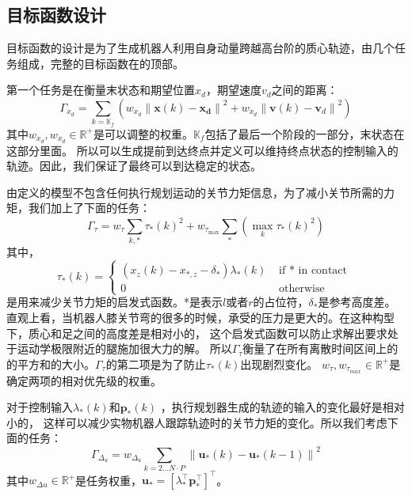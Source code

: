\subsection{目标函数设计}
\label{cost_function}
目标函数的设计是为了生成机器人利用自身动量跨越高台阶的质心轨迹，由几个任务组成，完整的目标函数在的顶部。

第一个任务是在衡量末状态和期望位置${x}_d$，期望速度${v}_d$之间的距离：
\begin{equation}
    \label{equ:cost_1}
    \Gamma_{x_d}=\sum_{k=\mathbb{K}_f}\left(w_{x_d}\left\|\boldsymbol{x}(k)-\boldsymbol{x}_{\boldsymbol{d}}\right\|^2+w_{\dot{x}_d}\left\|\boldsymbol{v}(k)-\boldsymbol{v}_d\right\|^2\right)
\end{equation}
其中$w_{x_d}, w_{\dot{x}_d} \in \mathbb{R}^{+}$是可以调整的权重。$\mathbb{K}_f$包括了最后一个阶段的一部分，末状态在这部分里面。
所以可以生成提前到达终点并定义可以维持终点状态的控制输入的轨迹。因此，我们保证了最终可以到达稳定的状态。

由定义的模型不包含任何执行规划运动的关节力矩信息，为了减小关节所需的力矩，我们加上了下面的任务：
\begin{equation}
    \label{equ:cost_2}
    \Gamma_\tau=w_\tau \sum_{k, *} \tau_*(k)^2+w_{\tau_{\max }} \sum_*\left(\max _k \tau_*(k)^2\right)
\end{equation}
其中，
\begin{equation}
    \label{equ:tau}
    \tau_*(k)= \begin{cases}\left(x_z(k)-x_{*, z}-\delta_*\right) \lambda_*(k) & \text { if } * \text { in contact } \\ 0 & \text { otherwise }\end{cases}
\end{equation}
是用来减少关节力矩的启发式函数。*是表示$l$或者$r$的占位符，$\delta_*$是参考高度差。
直观上看，当机器人膝关节弯的很多的时候，承受的压力是更大的。在这种构型下，质心和足之间的高度差是相对小的，
这个启发式函数可以防止求解出要求处于运动学极限附近的腿施加很大力的解。
所以$\Gamma_\tau$衡量了在所有离散时间区间上的的平方和的大小。$\Gamma_\tau$的第二项是为了防止$\tau_*(k)$出现剧烈变化。
$w_{\tau}, w_{\tau_{max}} \in \mathbb{R}^+$是确定两项的相对优先级的权重。

对于控制输入$\lambda_*(k)$和$\boldsymbol{p}_*(k)$ ，执行规划器生成的轨迹的输入的变化最好是相对小的，
这样可以减少实物机器人跟踪轨迹时的关节力矩的变化。所以我们考虑下面的任务：
\begin{equation}
    \label{equ:cost_3}
    \Gamma_{\Delta_u}=w_{\Delta_u} \sum_{k=2 \ldots N \cdot P}\left\|\boldsymbol{u}_*(k)-\boldsymbol{u}_*(k-1)\right\|^2
\end{equation}
其中$w_{\Delta u} \in \mathbb{R}^+$是任务权重，$\boldsymbol{u}_*=\left[\lambda_*^{\top} \boldsymbol{p}_*^{\top}\right]^{\top}$。


